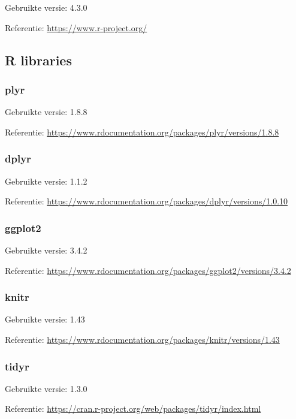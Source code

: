 \documentclass[
]{article}
\begin{document}
Gebruikte versie: 4.3.0

Referentie: \url{https://www.r-project.org/}

\hypertarget{r-libraries}{%
\subsection{R libraries}\label{r-libraries}}

\hypertarget{plyr}{%
\subsubsection{plyr}\label{plyr}}

Gebruikte versie: 1.8.8

Referentie:
\url{https://www.rdocumentation.org/packages/plyr/versions/1.8.8}

\hypertarget{dplyr}{%
\subsubsection{dplyr}\label{dplyr}}

Gebruikte versie: 1.1.2

Referentie:
\url{https://www.rdocumentation.org/packages/dplyr/versions/1.0.10}

\hypertarget{ggplot2}{%
\subsubsection{\texorpdfstring{\textbf{ggplot2}}{ggplot2}}\label{ggplot2}}

Gebruikte versie: 3.4.2

Referentie:
\url{https://www.rdocumentation.org/packages/ggplot2/versions/3.4.2}

\hypertarget{knitr}{%
\subsubsection{\texorpdfstring{\textbf{knitr}}{knitr}}\label{knitr}}

Gebruikte versie: 1.43

Referentie:
\url{https://www.rdocumentation.org/packages/knitr/versions/1.43}

\hypertarget{tidyr}{%
\subsubsection{tidyr}\label{tidyr}}

Gebruikte versie: 1.3.0

Referentie: \url{https://cran.r-project.org/web/packages/tidyr/index.html}
\end{document}
